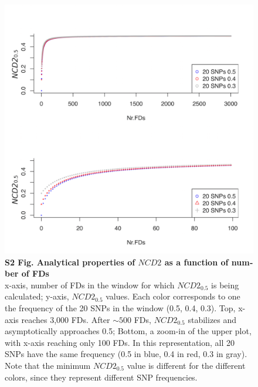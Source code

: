 \begin{refsection}
\begin{otherlanguage}{english}
\begin{figure}[tbph]
\includegraphics[]{chap2_folder/supp_figures/S2_Fig.png}
\caption*{\textbf{S2 Fig. Analytical properties of $NCD2$ as a function of number of FDs}\\
x-axis, number of FDs in the window for which $NCD2_{0.5}$ is being calculated; y-axis, $NCD2_{0.5}$ values. Each color corresponds to one the frequency of the 20 SNPs in the window (0.5, 0.4, 0.3). Top, x-axis reaches 3,000 FDs. After $\sim 500$ FDs, $NCD2_{0.5}$ stabilizes and asymptotically approaches 0.5; Bottom, a zoom-in of the upper plot, with x-axis reaching only 100 FDs. In this representation, all 20 SNPs have the same frequency (0.5 in blue, 0.4 in red, 0.3 in gray). Note that the minimum $NCD2_{0.5}$ value is different for the different colors, since they represent different SNP frequencies.}
\end{figure}
%
%


\end{otherlanguage}
\end{refsection}
